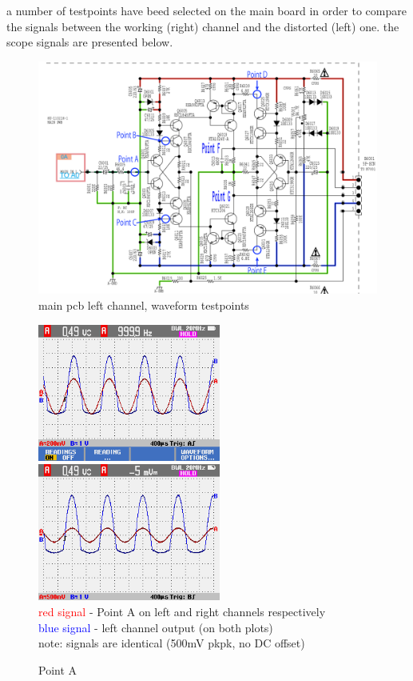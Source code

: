 \documentclass[a4paper,twoside]{report}
\begin{document}
a number of testpoints have beed selected on the main board in order to compare the signals between the working (right) channel and the distorted (left) one. the scope signals are presented below.

\begin{figure}[hptb!]
    \centering
    \includegraphics[width=12cm]{img_report/waveform_testpoints}
 \caption{main pcb left channel, waveform testpoints}
 \label{fig:waveform-testpoints}
\end{figure}

\begin{figure}[hptb!]
    \centering
    \includegraphics[width=6cm]{img_report/left_point_A.png}
    \includegraphics[width=6cm]{img_report/right_point_A.png} \\ 
    \textcolor{Red}{red signal} - Point A on left and right channels respectively \\
    \textcolor{Blue}{blue signal} - left channel output (on both plots) \\
    note: signals are identical (500mV pkpk, no DC offset)
 \caption{Point A}
 \label{fig:point-A}
\end{figure}
\end{document}
